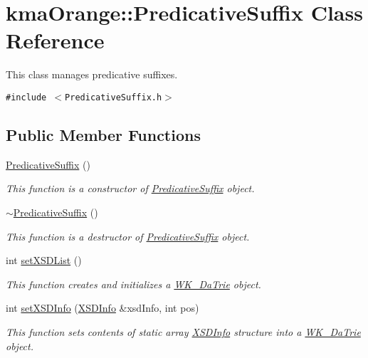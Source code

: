 \hypertarget{classkmaOrange_1_1PredicativeSuffix}{
\section{kmaOrange::PredicativeSuffix Class Reference}
\label{classkmaOrange_1_1PredicativeSuffix}
}
This class manages predicative suffixes.  


{\tt \#include $<$PredicativeSuffix.h$>$}

\subsection*{Public Member Functions}
\begin{CompactItemize}
\item 
\hyperlink{classkmaOrange_1_1PredicativeSuffix_e6af0d4e25391737834521bff61267ea}{PredicativeSuffix} ()
\begin{CompactList}\small\item\em This function is a constructor of \hyperlink{classkmaOrange_1_1PredicativeSuffix}{PredicativeSuffix} object. \item\end{CompactList}\item 
\hyperlink{classkmaOrange_1_1PredicativeSuffix_e18bf02cb3dee60bb228824f4b319ff4}{$\sim$PredicativeSuffix} ()
\begin{CompactList}\small\item\em This function is a destructor of \hyperlink{classkmaOrange_1_1PredicativeSuffix}{PredicativeSuffix} object. \item\end{CompactList}\item 
int \hyperlink{classkmaOrange_1_1PredicativeSuffix_03b3bc03d1f07f20cfa2167ff89dba0a}{setXSDList} ()
\begin{CompactList}\small\item\em This function creates and initializes a \hyperlink{classkmaOrange_1_1WK__DaTrie}{WK\_\-DaTrie} object. \item\end{CompactList}\item 
int \hyperlink{classkmaOrange_1_1PredicativeSuffix_fda9a2d25687af35ea311de9bc2b5af8}{setXSDInfo} (\hyperlink{structkmaOrange_1_1XSDInfo}{XSDInfo} \&xsdInfo, int pos)
\begin{CompactList}\small\item\em This function sets contents of static array \hyperlink{structkmaOrange_1_1XSDInfo}{XSDInfo} structure into a \hyperlink{classkmaOrange_1_1WK__DaTrie}{WK\_\-DaTrie} object. \item\end{CompactList}\item 

\end{CompactItemize}
